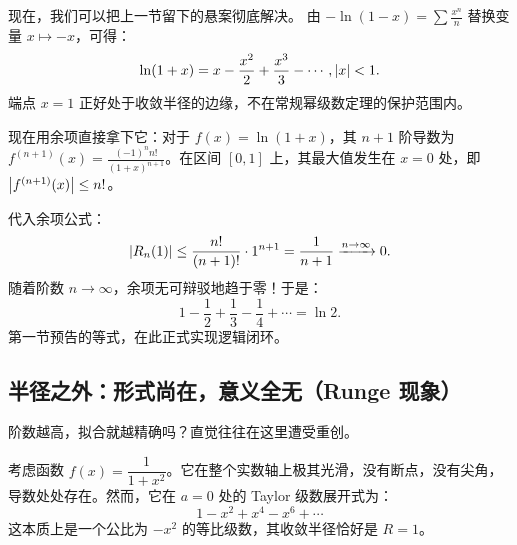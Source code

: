 现在，我们可以把上一节留下的悬案彻底解决。
由 \(-\ln(1-x) = \sum \frac{x^n}{n}\) 替换变量 \(x \mapsto -x\)，可得：
\[
\ln(1+x) = x - \frac{x^2}{2} + \frac{x^3}{3} - \cdots,\space \left|x\right| < 1.
\]
端点 \(x=1\) 正好处于收敛半径的边缘，不在常规幂级数定理的保护范围内。

现在用余项直接拿下它：对于 \(f(x) = \ln(1+x)\)，其 \(n+1\) 阶导数为 \(f^{(n+1)}(x) = \frac{(-1)^n n!}{(1+x)^{n+1}}\)。在区间 \([0, 1]\) 上，其最大值发生在 \(x=0\) 处，即 \(\left|f^{(n+1)}(x)\right| \le n!\)。

代入余项公式：
\[
\left|R_n(1)\right| \le \frac{n!}{(n+1)!} \cdot 1^{n+1} = \frac{1}{n+1} \xrightarrow{n \to \infty} 0.
\]
随着阶数 \(n \to \infty\)，余项无可辩驳地趋于零！于是：
\[
1 - \frac12 + \frac13 - \frac14 + \cdots = \ln 2.
\]
第一节预告的等式，在此正式实现逻辑闭环。

\subsection{半径之外：形式尚在，意义全无（Runge 现象）}

阶数越高，拟合就越精确吗？直觉往往在这里遭受重创。

考虑函数 \(f(x) = \dfrac{1}{1+x^2}\)。它在整个实数轴上极其光滑，没有断点，没有尖角，导数处处存在。然而，它在 \(a=0\) 处的 Taylor 级数展开式为：
\[
1 - x^2 + x^4 - x^6 + \cdots
\]
这本质上是一个公比为 \(-x^2\) 的等比级数，其收敛半径恰好是 \(R=1\)。

